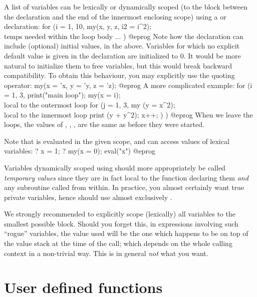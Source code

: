 A list of variables can be lexically or dynamically scoped (to the block
between the declaration and the end of the innermost enclosing scope) using a
 or  declaration:
\bprog
for (i = 1, 10,
  my(x, y, z, i2 = i^2); \\ temps needed within the loop body
  ...
)
@eprog\noindent
Note how the declaration can include (optional) initial values,  in the above. Variables for which no explicit default value is given
in the declaration are initialized to $0$. It would be more natural to
initialize them to free variables, but this would break backward
compatibility. To obtain this behaviour, you may explicitly use the quoting
operator:
\bprog
my(x = 'x, y = 'y, z = 'z);
@eprog\noindent
A more complicated example:
\bprog
for (i = 1, 3,
  print("main loop");
  my(x = i);          \\ local to the outermost loop
  for (j = 1, 3,
    my (y = x^2);     \\ local to the innermost loop
    print (y + y^2);
    x++;
  )
)
@eprog\noindent
When we leave the loops, the values of , , , 
are the same as before they were started.

Note that  is evaluated in the given scope, and can access values
of lexical variables:
\bprog
? x = 1;
? my(x = 0); eval("x")
@eprog

Variables dynamically scoped using  should more appropriately be
called \emph{temporary values} since they are in fact local to the function
declaring them \emph{and} any subroutine called from within. In practice, you
almost certainly want true private variables, hence should use almost
exclusively .

We strongly recommended to explicitly scope (lexically) all variables to the
smallest possible block. Should you forget this, in expressions involving such
``rogue'' variables, the value used will be the one which happens to be on
top of the value stack at the time of the call; which depends on the whole
calling context in a non-trivial way. This is in general \emph{not} what you
want.

\section{User defined functions}
\label{se:user_defined}

